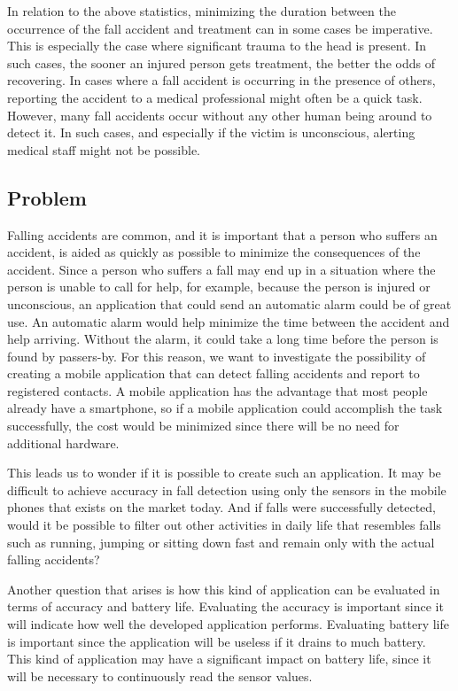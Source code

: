 \documentclass[12pt, a4paper, onecolumn]{article}
\begin{document}
	In relation to the above statistics, minimizing the duration between the occurrence of the fall accident and treatment can in some cases be imperative. This is especially the case where significant trauma to the head is present. In such cases, the sooner an injured person gets treatment, the better the odds of recovering. In cases where a fall accident is occurring in the presence of others, reporting the accident to a medical professional might often be a quick task. However, many fall accidents occur without any other human being around to detect it. In such cases, and especially if the victim is unconscious, alerting medical staff might not be possible.
	
	
	\subsection{Problem}
	
	Falling accidents are common, and it is important that a person who suffers an accident, is aided as quickly as possible to minimize the consequences of the accident. Since a person who suffers a fall may end up in a situation where the person is unable to call for help, for example, because the person is injured or unconscious, an application that could send an automatic alarm could be of great use. An automatic alarm would help minimize the time between the accident and help arriving. Without the alarm, it could take a long time before the person is found by passers-by. For this reason, we want to investigate the possibility of creating a mobile application that can detect falling accidents and report to registered contacts. A mobile application has the advantage that most people already have a smartphone, so if a mobile application could accomplish the task successfully, the cost would be minimized since there will be no need for additional hardware.
	
	This leads us to wonder if it is possible to create such an application. It may be difficult to achieve accuracy in fall detection using only the sensors in the mobile phones that exists on the market today. And if falls were successfully detected, would it be possible to filter out other activities in daily life that resembles falls such as running, jumping or sitting down fast and remain only with the actual falling accidents?
	
	Another question that arises is how this kind of application can be evaluated in terms of accuracy and battery life. Evaluating the accuracy is important since it will indicate how well the developed application performs. Evaluating battery life is important since the application will be useless if it drains to much battery. This kind of application may have a significant impact on battery life, since it will be necessary to continuously read the sensor values.
	
\end{document}
